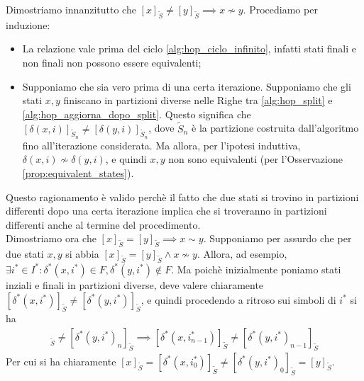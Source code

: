 \begin{proof2}
    Dimostriamo innanzitutto che $[x]_{\widetilde{S}} \neq [y]_{\widetilde{S}} \implies x \not\sim y$. Procediamo per induzione:
    \begin{itemize}
        \item La relazione vale prima del ciclo \ref{alg:hop_ciclo_infinito}, infatti stati finali e non finali non possono essere equivalenti;
        \item Supponiamo che sia vero prima di una certa iterazione. Supponiamo che gli stati $x,y$ finiscano in partizioni diverse nelle Righe tra \ref{alg:hop_split} e \ref{alg:hop_aggiorna_dopo_split}. Questo significa che $[\delta(x,i)]_{\widetilde{S}_n} \neq [\delta(y,i)]_{\widetilde{S}_n}$, dove $\widetilde{S}_n$ è la partizione costruita dall'algoritmo fino all'iterazione considerata. Ma allora, per l'ipotesi induttiva, $\delta(x,i) \not\sim \delta(y,i)$, e quindi $x,y$ non sono equivalenti (per l'Osservazione \ref{prop:equivalent_states}).
    \end{itemize}
    Questo ragionamento è valido perchè il fatto che due stati si trovino in partizioni differenti dopo una certa iterazione implica che si troveranno in partizioni differenti anche al termine del procedimento.\\
    Dimostriamo ora che $[x]_{\widetilde{S}} = [y]_{\widetilde{S}} \implies x \sim y$. Supponiamo per assurdo che per due stati $x,y$ si abbia $[x]_{\widetilde{S}} = [y]_{\widetilde{S}} \land x \not\sim y$. Allora, ad esempio, $\exists i^* \in I^* : \delta^*(x,i^*) \in F, \delta^*(y,i^*) \not\in F$. Ma poichè inizialmente poniamo stati inziali e finali in partizioni diverse, deve valere chiaramente $[\delta^*(x,i^*)]_{\widetilde{S}} \neq [\delta^*(y,i^*)]_{\widetilde{S}}$, e quindi procedendo a ritroso sui simboli di $i^*$ si ha
    \begin{gather*}
        [\delta^*(x,i^*_n)]_{\widetilde{S}} \neq [\delta^*(y,i^*)_n]_{\widetilde{S}} \implies [\delta^*(x,i^*_{n-1})]_{\widetilde{S}} \neq [\delta^*(y,i^*)_{n-1}]_{\widetilde{S}}
    \end{gather*}
    Per cui si ha chiaramente $[x]_{\widetilde{S}} = [\delta^*(x,i^*_0)]_{\widetilde{S}} \neq [\delta^*(y,i^*)_0]_{\widetilde{S}} = [y]_{\widetilde{S}}$.
\end{proof2}

